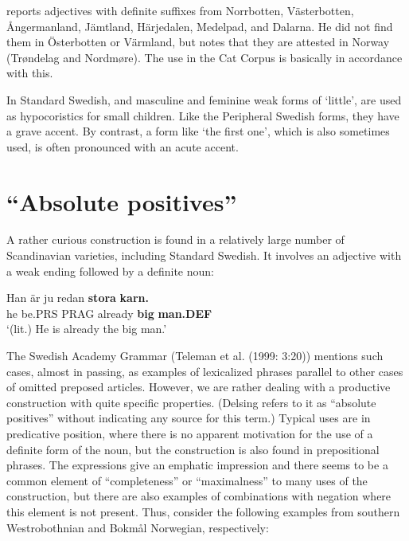 
\citet[51]{Delsing2003a} reports adjectives with definite suffixes from Norrbotten, Västerbotten, Ångermanland, Jämtland, Härjedalen, Medelpad, and Dalarna. He did not find them in Österbotten or Värmland, but notes that they are attested in Norway (Trøndelag and Nordmøre). The use in the Cat Corpus is basically in accordance with this. 


In Standard Swedish,  and  masculine and feminine weak forms of  ‘little’, are used as hypocoristics for small children. Like the Peripheral Swedish forms, they have a grave accent. By contrast, a form like  ‘the first one’, which is also sometimes used, is often pronounced with an acute accent. 


\section{“Absolute positives”}
\label{bkm:Ref141250984}
A rather curious construction is found in a relatively large number of Scandinavian varieties, including Standard Swedish. It involves an adjective with a weak ending followed by a definite noun:


\ea\label{}
\gll Han  är  ju  redan  \textbf{stora}\textbf{  karn.}\\
he  be.PRS  PRAG  already  \textbf{big} \textbf{man.DEF}\\
\glt ‘(lit.) He is already the big man.’
\z

The Swedish Academy Grammar (Teleman et al. (1999: 3:20)) mentions such cases, almost in passing, as examples of lexicalized phrases parallel to other cases of omitted preposed articles. However, we are rather dealing with a productive construction with quite specific properties. (Delsing refers to it as “absolute positives” without indicating any source for this term.) Typical uses are in predicative position, where there is no apparent motivation for the use of a definite form of the noun, but the construction is also found in prepositional phrases. The expressions give an emphatic impression and there seems to be a common element of “completeness” or “maximalness” to many uses of the construction, but there are also examples of combinations with negation where this element is not present. Thus, consider the following examples from southern Westrobothnian and Bokmål Norwegian, respectively: 

